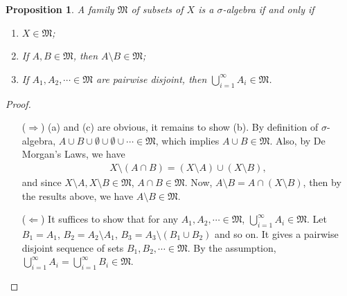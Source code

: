 \documentclass[11pt]{book}
\newtheorem{proposition}{Proposition}[chapter]
\theoremstyle{definition}
\numberwithin{equation}{chapter}
\def\MM{\mathfrak{M}}
\begin{document}
\medskip

\begin{proposition}\label{prop_11}
A family $\MM$ of subsets of $X$ is a $\sigma$-algebra if and only if
\begin{enumerate}[label=(\alph*)]
    \item $X \in \MM$;
    
    \item If $A,B \in \MM$, then $A \setminus B \in \MM$;
    
    \item If $A_1, A_2, \cdots \in \MM$ are pairwise disjoint, then $\bigcup^\infty_{i=1} A_i \in \MM$.
\end{enumerate}
\end{proposition}
\begin{proof} 
~\begin{enumerate}
    \item[($\Rightarrow$)] (a) and (c) are obvious, it remains to show (b). By definition of $\sigma$-algebra, $A \cup B \cup \emptyset \cup \emptyset \cup \cdots \in \MM$, which implies $A \cup B \in \MM$. Also, by De Morgan's Laws, we have 
    \begin{align*}
        X \setminus (A \cap B) = (X \setminus A) \cup (X \setminus B),
    \end{align*}
    and since $X \setminus A, X \setminus B \in \MM$, $A \cap B \in \MM$. Now, $A \setminus B = A \cap (X \setminus B)$, then by the results above, we have $A \setminus B \in \MM$.
    
    \item[($\Leftarrow$)] It suffices to show that for any $A_1, A_2,\cdots \in \MM$, $\bigcup^\infty_{i=1}A_i \in \MM$. Let $B_1 = A_1$, $B_2 = A_2 \setminus A_1$, $B_3 = A_3 \setminus (B_1 \cup B_2)$ and so on. It gives a pairwise disjoint sequence of sets $B_1, B_2, \cdots \in \MM$. By the assumption, $\bigcup^\infty_{i=1}A_i = \bigcup^\infty_{i=1}B_i \in \MM$.
\end{enumerate}
\end{proof}

\medskip
\end{document}
